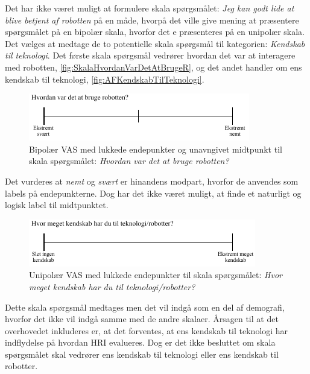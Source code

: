 \noindent
%
Det har ikke været muligt at formulere skala spørgsmålet: \textit{Jeg kan godt lide at blive betjent af robotten} på en måde, hvorpå det ville give mening at præsentere spørgsmålet på en bipolær skala, hvorfor det e præsenteres på en unipolær skala.\blankline
%
Det vælges at medtage de to potentielle skala spørgsmål til kategorien: \textit{Kendskab til teknologi}. Det første skala spørgsmål vedrører hvordan det var at interagere med robotten, \autoref{fig:SkalaHvordanVarDetAtBrugeR}, og det andet handler om ens kendskab til teknologi, \autoref{fig:AFKendskabTilTeknologi}.
%
\begin{figure}[H]
\centering
\includegraphics[width =\textwidth]{Figure/UdvalgteSkalaer/HvordanVarDetAtBrugeR} 
\caption{Bipolær VAS med lukkede endepunkter og unavngivet midtpunkt til skala spørgsmålet: \textit{Hvordan var det at bruge robotten?}}
\label{fig:SkalaHvordanVarDetAtBrugeR}
\end{figure}
\noindent
%
Det vurderes at \textit{nemt} og \textit{svært} er hinandens modpart, hvorfor de anvendes som labels på endepunkterne. Dog har det ikke været muligt, at finde et naturligt og logisk label til midtpunktet. 
%
\begin{figure}[H]
\centering
\includegraphics[width =\textwidth]{Figure/UdvalgteSkalaer/KendskabTilTeknologi} 
\caption{Unipolær VAS med lukkede endepunkter til skala spørgsmålet: \textit{Hvor meget kendskab har du til teknologi/robotter?}}
\label{fig:SkalaKendskabTilTeknologi}
\end{figure}
\noindent
%
Dette skala spørgsmål medtages men det vil indgå som en del af demografi, hvorfor det ikke vil indgå samme med de andre skalaer. Årsagen til at det overhovedet inkluderes er, at det forventes, at ens kendskab til teknologi har indflydelse på hvordan HRI evalueres. Dog er det ikke besluttet om skala spørgsmålet skal vedrører ens kendskab til teknologi eller ens kendskab til robotter. \blankline 
